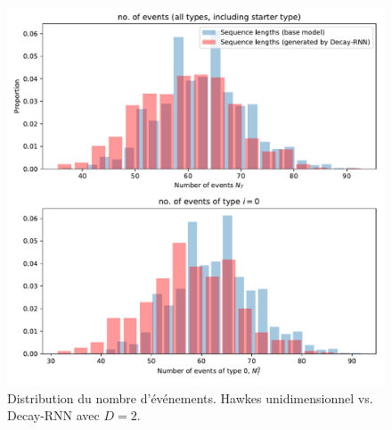 \documentclass[11pt]{article}
\begin{document}
\begin{figure}[h]
	\includegraphics[width=\linewidth]{../results/seq_length_distrib_Decay-RNN-1d-hidden_2.pdf}
	\caption{Distribution du nombre d'événements. Hawkes unidimensionnel vs. Decay-RNN avec $D=2$.}\label{fig:hawkesDecayRNNlengthDistrib}
\end{figure}


\printbibliography

\begin{appendices}
	


\end{appendices}
\end{document}
